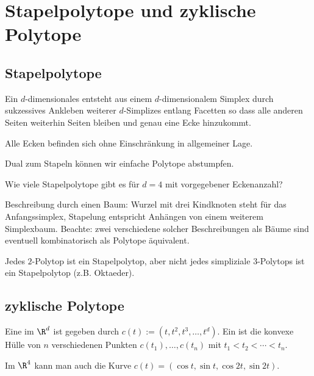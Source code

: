 \chapter{Stapelpolytope und zyklische Polytope}


\section{Stapelpolytope}


\begin{df}
    Ein $d$-dimensionales  entsteht aus einem $d$-dimensionalem Simplex durch sukzessives Ankleben weiterer $d$-Simplizes entlang Facetten so dass alle anderen Seiten weiterhin Seiten bleiben und genau eine Ecke hinzukommt.
    \begin{note}
        Alle Ecken befinden sich ohne Einschränkung in allgemeiner Lage.
    \end{note}
\end{df}

\begin{note}
    Dual zum Stapeln können wir einfache Polytope abstumpfen.
\end{note}

Wie viele Stapelpolytope gibt es für $d=4$ mit vorgegebener Eckenanzahl?

Beschreibung durch einen Baum: Wurzel mit drei Kindknoten steht für das Anfangssimplex, Stapelung entspricht Anhängen von einem weiterem Simplexbaum.
Beachte: zwei verschiedene solcher Beschreibungen als Bäume sind eventuell kombinatorisch als Polytope äquivalent.

\begin{note}
    Jedes $2$-Polytop ist ein Stapelpolytop, aber nicht jedes simpliziale $3$-Polytops ist ein Stapelpolytop (z.B. Oktaeder).
\end{note}


\section{zyklische Polytope}


\begin{df}
    Eine  im $\R^d$ ist gegeben durch
    \begin{math}
        c(t) := (t,t^2,t^3, \dotsc, t^d).
    \end{math}
    Ein  ist die konvexe Hülle von $n$ verschiedenen Punkten $c(t_1), \dotsc, c(t_n)$ mit $t_1 < t_2 < \dotsb < t_n$.
    \begin{note}
        Im $\R^4$ kann man auch die Kurve $c(t) = (\cos t, \sin t, \cos 2t, \sin 2t)$.
    \end{note}
\end{df}

